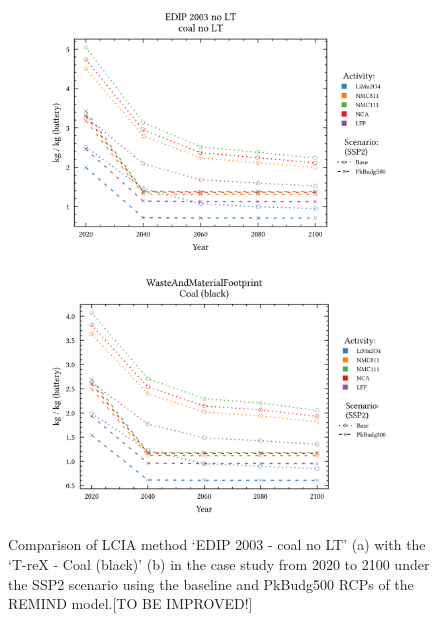 \begin{figure}[H]
    \centering
    \begin{subfigure}[b]{0.8\linewidth}
        \includegraphics[width=\linewidth]{figures/comparison_methods2.png}
        \caption{}\label{fig:comparison_methods_a}
    \end{subfigure}
    
    \begin{subfigure}[b]{0.8\linewidth}
        \includegraphics[width=\linewidth]{figures/comparison_methods1.png}
        \caption{}\label{fig:comparison_methods_b}
    \end{subfigure}
    \caption{Comparison of LCIA method `EDIP 2003 - coal no LT' (a) with the `T-reX - Coal (black)' (b) in the case study from 2020 to 2100 under the SSP2 scenario using the baseline and PkBudg500 RCPs of the REMIND model.[TO BE IMPROVED!]}\label{fig:comparison_methods}
\end{figure}

